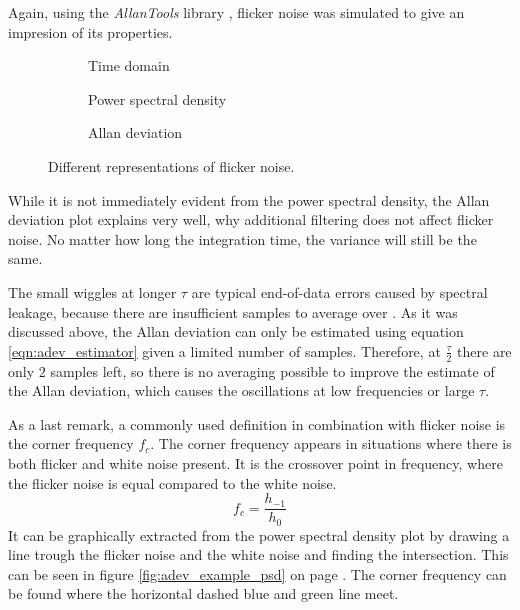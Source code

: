 Again, using the \textit{AllanTools} library \cite{allantools}, flicker noise was simulated to give an impresion of its properties.

\begin{figure}[ht]
    \centering
    \begin{subfigure}{0.32\linewidth}
        \centering
        \scalebox{0.75}{%
            
        } %
        \caption{Time domain}
        \label{fig:flicker_noise_time}
    \end{subfigure}
    \begin{subfigure}{0.32\linewidth}
        \centering
        \scalebox{0.75}{%
            
        } %
        \caption{Power spectral density}
        \label{fig:flicker_noise_psd}
    \end{subfigure}
    \begin{subfigure}{0.32\linewidth}
        \centering
        \scalebox{0.75}{%
            
        } %
        \caption{Allan deviation}
        \label{fig:flicker_noise_adev}
    \end{subfigure}
    \caption{Different representations of flicker noise.}
    \label{fig:flicker_noise_simulated}
\end{figure}

While it is not immediately evident from the power spectral density, the Allan deviation plot explains very well, why additional filtering does not affect flicker noise. No matter how long the integration time, the variance will still be the same.

The small wiggles at longer $\tau$ are typical end-of-data errors caused by spectral leakage, because there are insufficient samples to average over \cite{adev_long_tau}. As it was discussed above, the Allan deviation can only be estimated using equation \ref{eqn:adev_estimator} given a limited number of samples. Therefore, at $\frac{\tau}{2}$ there are only $2$ samples left, so there is no averaging possible to improve the estimate of the Allan deviation, which causes the oscillations at low frequencies or large $\tau$.

As a last remark, a commonly used definition in combination with flicker noise is the corner frequency $f_c$. The corner frequency appears in situations where there is both flicker and white noise present. It is the crossover point in frequency, where the flicker noise is equal compared to the white noise.
\begin{equation}
    f_c = \frac{h_{-1}}{h_0} \label{eqn:corner_frequency}
\end{equation}
It can be graphically extracted from the power spectral density plot by drawing a line trough the flicker noise and the white noise and finding the intersection. This can be seen in figure \ref{fig:adev_example_psd} on page \pageref{fig:adev_example_psd}. The corner frequency can be found where the horizontal dashed blue and green line meet.

